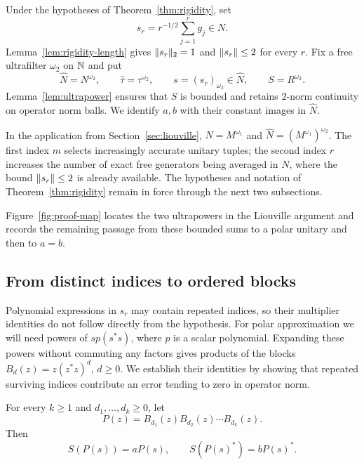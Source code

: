 Under the hypotheses of Theorem~\ref{thm:rigidity}, set
\begin{equation}\label{eq:rigidity-normalized-sums}
 s_r=r^{-1/2}\sum_{j=1}^r g_j\in N.
\end{equation}
Lemma~\ref{lem:rigidity-length} gives $\lVert s_r\rVert_2=1$ and
$\lVert s_r\rVert\leq2$ for every $r$.  Fix a free ultrafilter $\omega_2$ on
$\mathbb N$ and put
\begin{equation}\label{eq:rigidity-second-ultrapower}
 \widehat N=N^{\omega_2},\qquad
 \widehat\tau=\tau^{\omega_2},\qquad
 s=(s_r)_{\omega_2}\in\widehat N,\qquad S=R^{\omega_2}.
\end{equation}
Lemma~\ref{lem:ultrapower} ensures that $S$ is bounded and retains
$2$-norm continuity on operator norm balls.  We identify $a,b$ with
their constant images in $\widehat N$.

In the application from Section~\ref{sec:liouville},
$N=M^{\omega_1}$ and $\widehat N=(M^{\omega_1})^{\omega_2}$.
The first index $m$ selects increasingly accurate unitary tuples; the
second index $r$ increases the number of exact free generators being
averaged in $N$, where the bound $\lVert s_r\rVert\leq2$ is already available.
The hypotheses and notation of Theorem~\ref{thm:rigidity} remain in
force through the next two subsections.

Figure~\ref{fig:proof-map} locates the two ultrapowers in the Liouville
argument and records the remaining passage from these bounded sums to a
polar unitary and then to $a=b$.


\subsection{From distinct indices to ordered blocks}

Polynomial expressions in $s_r$ may contain repeated indices, so their
multiplier identities do not follow directly from the hypothesis.
For polar approximation we will need powers of $sp(s^*s)$, where $p$
is a scalar polynomial.  Expanding these powers without commuting any
factors gives products of the blocks $B_d(z)=z(z^*z)^d$, $d\geq0$.
We establish their identities by showing that repeated surviving indices
contribute an error tending to zero in operator norm.

\begin{lemma}\label{lem:rigidity-blocks}
For every $k\geq1$ and $d_1,\ldots,d_k\geq0$, let
\[
 P(z)=B_{d_1}(z)B_{d_2}(z)\cdots B_{d_k}(z).
\]
Then
\begin{equation}\label{eq:rigidity-block-identities}
 S(P(s))=aP(s),\qquad S(P(s)^*)=bP(s)^*.
\end{equation}
\end{lemma}

